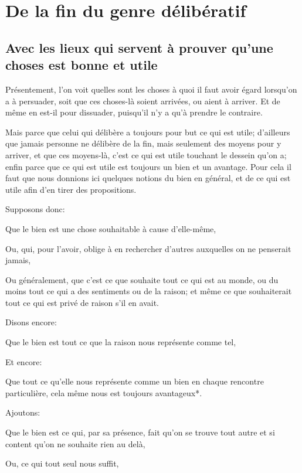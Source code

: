 
\section{De la fin du genre délibératif}
\subsection{Avec les lieux qui servent à prouver qu'une choses est bonne et utile}


Présentement, l'on voit quelles sont les choses à quoi il faut avoir égard lorsqu'on a à persuader, soit que ces choses-là
soient arrivées, ou aient à arriver. Et de même en est-il pour dissuader, puisqu'il n'y a qu'à prendre le contraire. 

Mais parce que celui qui délibère a toujours pour but ce qui est utile; d'ailleurs que jamais personne ne délibère de la
fin, mais seulement des moyens pour y arriver, et que ces moyens-là, c'est ce qui est utile touchant le dessein qu'on a;
enfin parce que ce qui est utile est toujours un bien et un avantage. Pour cela il faut que nous donnions ici quelques
notions du bien en général, et de ce qui est utile afin d'en tirer des propositions.

Supposons donc: 

\begin{emphpar}
     Que le bien est une chose souhaitable à cause d'elle-même,

     Ou, qui, pour l'avoir, oblige à en rechercher d'autres auxquelles on ne penserait jamais,

     Ou généralement, que c'est ce que souhaite tout ce qui est au monde, ou du moins tout ce qui a des sentiments ou de
     la raison; et même ce que souhaiterait tout ce qui est privé de raison s'il en avait.
\end{emphpar}

Disons encore:

\begin{emphpar}
     Que le bien est tout ce que la raison nous représente comme tel,
\end{emphpar}

Et encore:

\begin{emphpar}
     Que tout ce qu'elle nous représente comme un bien en chaque rencontre particulière, cela même nous est toujours avantageux*.
\end{emphpar}

Ajoutons:

\begin{emphpar}
     Que le bien est ce qui, par sa présence, fait qu'on se trouve tout autre et si content qu'on ne souhaite rien au delà,

     Ou, ce qui tout seul nous suffit,
\end{emphpar}


